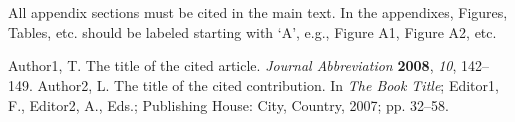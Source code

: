 \documentclass[preprints,article,accept,moreauthors,pdftex]{Definitions/mdpi}
\begin{document}
\section{}
All appendix sections must be cited in the main text. In the appendixes, Figures, Tables, etc. should be labeled starting with `A', e.g., Figure A1, Figure A2, etc.



%

\begin{thebibliography}{999}
Author1, T. The title of the cited article. {\em Journal Abbreviation} {\bf 2008}, {\em 10}, 142--149.
Author2, L. The title of the cited contribution. In {\em The Book Title}; Editor1, F., Editor2, A., Eds.; Publishing House: City, Country, 2007; pp. 32--58.
\end{thebibliography}





\end{document}
